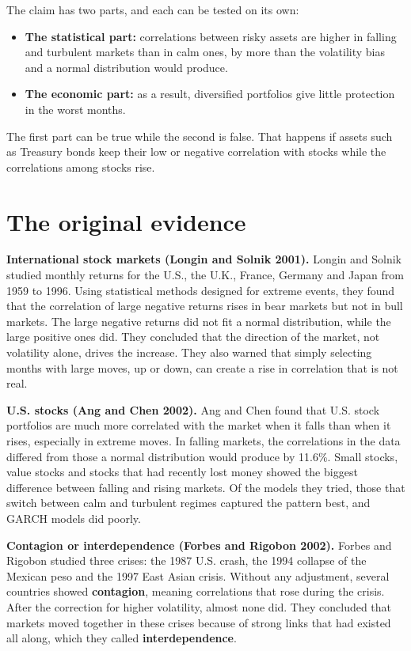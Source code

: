 The claim has two parts, and each can be tested on its own:

\begin{itemize}
  \item \textbf{The statistical part:} correlations between risky assets are higher in falling and turbulent markets than in calm ones, by more than the volatility bias and a normal distribution would produce.
  \item \textbf{The economic part:} as a result, diversified portfolios give little protection in the worst months.
\end{itemize}

The first part can be true while the second is false. That happens if assets such as Treasury bonds keep their low or negative correlation with stocks while the correlations among stocks rise.

\section{The original evidence}
\label{sec:13-evidence}

\textbf{International stock markets (Longin and Solnik 2001).} Longin and Solnik studied monthly returns for the U.S., the U.K., France, Germany and Japan from 1959 to 1996. Using statistical methods designed for extreme events, they found that the correlation of large negative returns rises in bear markets but not in bull markets. The large negative returns did not fit a normal distribution, while the large positive ones did. They concluded that the direction of the market, not volatility alone, drives the increase. They also warned that simply selecting months with large moves, up or down, can create a rise in correlation that is not real.

\textbf{U.S. stocks (Ang and Chen 2002).} Ang and Chen found that U.S. stock portfolios are much more correlated with the market when it falls than when it rises, especially in extreme moves. In falling markets, the correlations in the data differed from those a normal distribution would produce by 11.6\%. Small stocks, value stocks and stocks that had recently lost money showed the biggest difference between falling and rising markets. Of the models they tried, those that switch between calm and turbulent regimes captured the pattern best, and GARCH models did poorly.

\textbf{Contagion or interdependence (Forbes and Rigobon 2002).} Forbes and Rigobon studied three crises: the 1987 U.S. crash, the 1994 collapse of the Mexican peso and the 1997 East Asian crisis. Without any adjustment, several countries showed \textbf{contagion}, meaning correlations that rose during the crisis. After the correction for higher volatility, almost none did. They concluded that markets moved together in these crises because of strong links that had existed all along, which they called \textbf{interdependence}.

